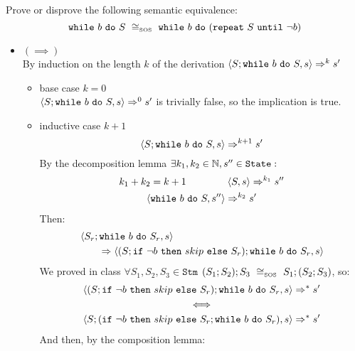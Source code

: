 \begin{exercise}{
    Prove or disprove the following semantic equivalence:
    \[ \wwhile{b}{S}\ \cong_{\text{\tiny SOS}}\ \wwhile{b}{(\wrepeat{S}{\neg b})}  \]
}
\begin{itemize}
\begin{itemize}
                \item $(\implies)$ \vspace{0.2cm} \\
                    By induction on the length $k$ of the derivation $\left<S;\texttt{while}\ b\ \texttt{do}\ S, s\right> \Rightarrow^k s'$
                    \begin{itemize}
                        \item base case $k=0$ \\
                            $\left<S;\texttt{while}\ b\ \texttt{do}\ S, s\right> \Rightarrow^0 s'$ is trivially false, so the implication is true.
                        \item inductive case $k+1$ \vspace*{-0.3cm}
                            \[ \left<S;\texttt{while}\ b\ \texttt{do}\ S, s\right> \Rightarrow^{k+1} s' \]
                            By the decomposition lemma $\exists k_1, k_2 \in \mathbb{N}, s'' \in \texttt{State} :$
                            \begin{gather*}
                                k_1 + k_2 = k + 1\qquad\qquad \left<S, s\right> \Rightarrow^{k_1} s'' \\
                                \left<\texttt{while}\ b\ \texttt{do}\ S, s''\right> \Rightarrow^{k_2} s'
                            \end{gather*}
                            Then:
                            \begin{align*}
                                &\left<S_r; \texttt{while}\ b\ \texttt{do}\ S_r, s\right>
                                \\&\qquad\Rightarrow \left<(S;\texttt{if}\ \neg b\ \texttt{then}\ skip\ \texttt{else}\ S_r); \texttt{while}\ b\ \texttt{do}\ S_r, s\right>
                            \end{align*}
                            We proved in class $\forall S_1, S_2, S_3 \in \texttt{Stm}$ $(S_1;S_2);S_3\ \cong_{\text{\tiny SOS}}\ S_1;(S_2;S_3)$, so:
                            \begin{gather*}
                                \left<(S;\texttt{if}\ \neg b\ \texttt{then}\ skip\ \texttt{else}\ S_r); \texttt{while}\ b\ \texttt{do}\ S_r, s\right> \Rightarrow^* s'
                                \\
                                \iff
                                \\
                                \left<S;(\texttt{if}\ \neg b\ \texttt{then}\ skip\ \texttt{else}\ S_r; \texttt{while}\ b\ \texttt{do}\ S_r), s\right> \Rightarrow^* s'
                            \end{gather*}
                            And then, by the composition lemma:
                            \begin{align*}

\end{align*}
\end{itemize}
\end{itemize}
\end{itemize}
\end{exercise}

